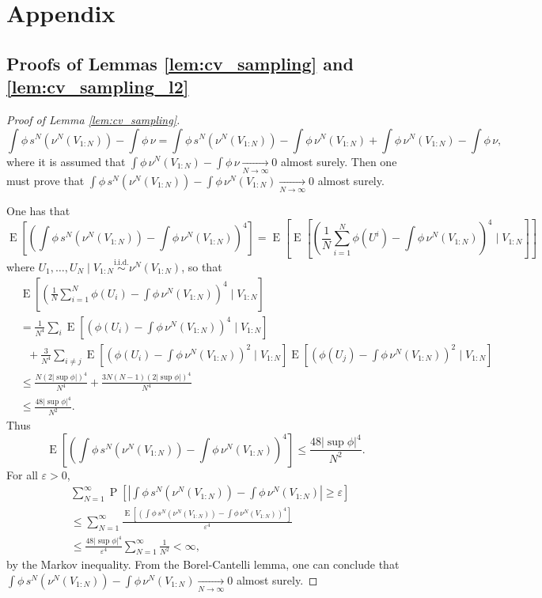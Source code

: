 \documentclass{article}
\newcommand{\simiid}{\overset{\text{i.i.d.}}{\sim}}
\newcommand{\limN}{\underset{N \rightarrow \infty}{\longrightarrow}}
\DeclareMathOperator{\prob}{P}
\DeclareMathOperator{\E}{E}
\begin{document}
\section*{Appendix}

\subsection{Proofs of Lemmas \ref{lem:cv_sampling} and \ref{lem:cv_sampling_l2}}
\label{sec:proof-sampling}

\begin{proof}[Proof of Lemma \ref{lem:cv_sampling}]
    $$\int \phi \, s^N(\nu^N(V_{1:N})) - \int \phi \, \nu = \int \phi \, s^N(\nu^N(V_{1:N})) - \int \phi \, \nu^N(V_{1:N}) + \int \phi \, \nu^N(V_{1:N}) - \int \phi \, \nu,$$
    where it is assumed that $\displaystyle \int \phi \, \nu^N(V_{1:N}) - \int \phi \, \nu \limN 0$ almost surely. Then one must prove that $\displaystyle \int \phi \, s^N(\nu^N(V_{1:N})) - \int \phi \, \nu^N(V_{1:N}) \limN 0$ almost surely.
    
    One has that
    $$\E[(\int \phi \, s^N (\nu^N(V_{1:N})) - \int \phi \, \nu^N(V_{1:N}))^4] = \E[\E[(\frac 1N \sum_{i=1}^N \phi(U^i) - \int \phi \, \nu^N(V_{1:N}))^4 \mid V_{1:N}]] $$
    where $U_1,\dots,U_N \mid V_{1:N} \simiid \nu^N(V_{1:N})$, so that
    \begin{align*}
      &\E[(\frac 1N \sum_{i=1}^N \phi(U_i) - \int \phi \, \nu^N(V_{1:N}))^4 \mid V_{1:N}] \\
      &= \frac{1}{N^4} \sum_i \E[(\phi(U_i) - \int \phi \, \nu^N(V_{1:N}))^4 \mid V_{1:N}] \\
      & \ \ \ + \frac{3}{N^4} \sum_{i \neq j} \E[(\phi(U_i) - \int \phi \, \nu^N(V_{1:N}))^2 \mid V_{1:N}] \E[(\phi(U_j) - \int \phi \, \nu^N(V_{1:N}))^2 \mid V_{1:N}] \\
      &\leq \frac{N (2 |\sup \phi|)^4}{N^4} + \frac{3 N(N-1) (2 |\sup \phi|)^4}{N^4} \\
      &\leq \frac{48 |\sup \phi|^4}{N^2}.
    \end{align*}
    Thus
    $$\E[(\int \phi \, s^N (\nu^N(V_{1:N})) - \int \phi \, \nu^N(V_{1:N}))^4] \leq \frac{48 |\sup \phi|^4}{N^2}. $$
    For all $\varepsilon>0$,
    \begin{align*}
        & \sum_{N=1}^{\infty} \prob [ |\int \phi \, s^N (\nu^N(V_{1:N})) - \int \phi \, \nu^N(V_{1:N})| \geq \varepsilon] \\
        &\leq \sum_{N=1}^\infty \frac{\E[(\int \phi \, s^N (\nu^N(V_{1:N})) - \int \phi \, \nu^N(V_{1:N}))^4]}{\varepsilon^4} \\
        &\leq \frac{48 |\sup \phi|^4}{\varepsilon^4}\sum_{N=1}^{\infty}\frac{1}{N^2} <\infty,
    \end{align*}
    by the Markov inequality. From the Borel-Cantelli lemma, one can conclude that
    $\displaystyle \int \phi \, s^N(\nu^N(V_{1:N})) - \int \phi \, \nu^N(V_{1:N}) \limN 0$ almost surely.
\end{proof}
\end{document}
